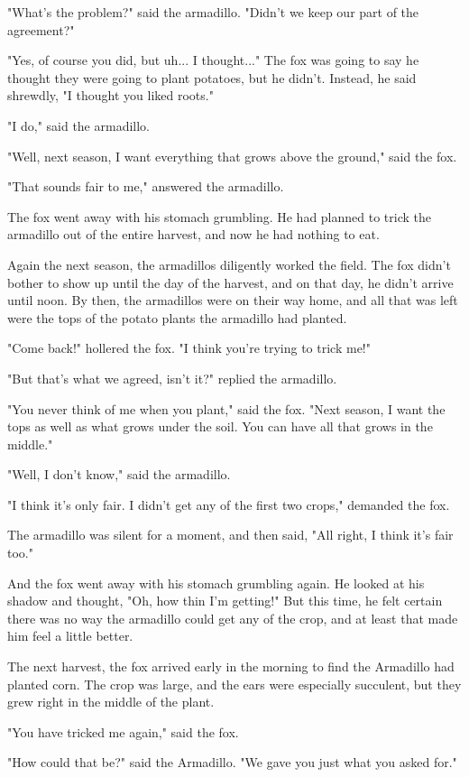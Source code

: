 "What's the problem?" said the armadillo. "Didn't we keep our part of the agreement?"

"Yes, of course you did, but uh... I thought..." The fox was going to say he thought they were going to plant potatoes, but he didn't. Instead, he said shrewdly, "I thought you liked roots."

"I do," said the armadillo.

"Well, next season, I want everything that grows above the ground," said the fox.

"That sounds fair to me," answered the armadillo.

The fox went away with his stomach grumbling. He had planned to trick the armadillo out of the entire harvest, and now he had nothing to eat.

Again the next season, the armadillos diligently worked the field. The fox didn't bother to show up until the day of the harvest, and on that day, he didn't arrive until noon. By then, the armadillos were on their way home, and all that was left were the tops of the potato plants the armadillo had planted.

"Come back!" hollered the fox. "I think you're trying to trick me!"

"But that's what we agreed, isn't it?" replied the armadillo.

"You never think of me when you plant," said the fox. "Next season, I want the tops as well as what grows under the soil. You can have all that grows in the middle."

"Well, I don't know," said the armadillo.

"I think it's only fair. I didn't get any of the first two crops," demanded the fox.

The armadillo was silent for a moment, and then said, "All right, I think it's fair too."

And the fox went away with his stomach grumbling again. He looked at his shadow and thought, "Oh, how thin I'm getting!" But this time, he felt certain there was no way the armadillo could get any of the crop, and at least that made him feel a little better.

The next harvest, the fox arrived early in the morning to find the Armadillo had planted corn. The crop was large, and the ears were especially succulent, but they grew right in the middle of the plant.

"You have tricked me again," said the fox.

"How could that be?" said the Armadillo. "We gave you just what you asked for."


